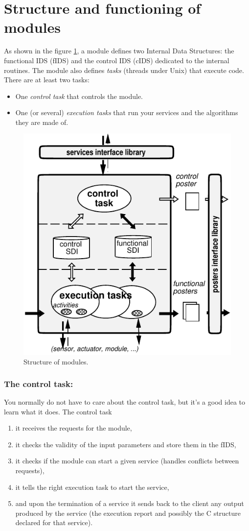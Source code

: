 
\section{Structure and functioning of modules}
\label{sec|module|module}

As shown in the figure  \ref{fig|module}, a  module defines two  Internal
Data Structures:  the functional IDS (fIDS)  and  the control  IDS (cIDS)
dedicated to the internal routines.  The module also defines {\em  tasks}
(threads under Unix) that execute code. There are at least two tasks:

\begin{itemize}
\item One {\em control task} that controls the module.
\item One (or several) {\em execution tasks} that run your services and
the algorithms they are made of.
\end{itemize}

\begin{figure}[htbp]
\centering
\includegraphics[width=0.5\hsize]{fig/module-en}
\caption{Structure of modules.}
\label{fig|module}
\end{figure}

\subsubsection{The control task:}

You normally do not have to care about the control task, but it's a good
idea to learn what it does. The control task

\begin{enumerate}
\item it receives the requests for the module,
\item it checks the validity of the input parameters and store them in the fIDS,
\item it checks if the module can start a given service (handles conflicts
between requests),
\item it tells the right execution task to start the service,
\item and upon the termination of a service it sends back to the client
any output produced by the service (the execution report and possibly the
C structure declared for that service).
\end{enumerate}

